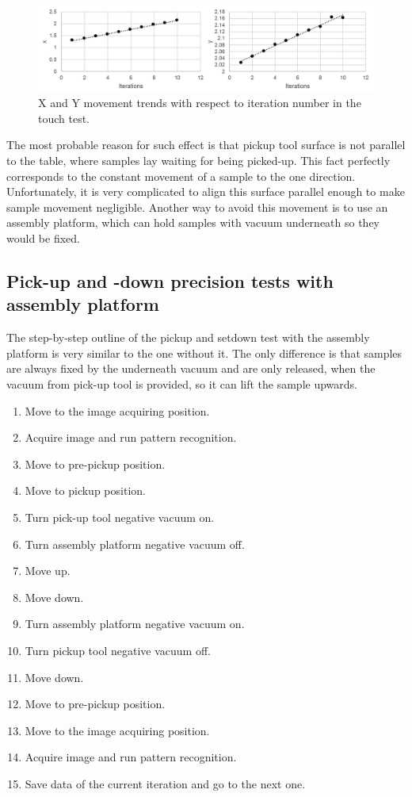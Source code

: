 \begin{figure}[ht]\centering
\includegraphics[width=1\linewidth]{Data/Precision_tests/XY_touch_movement.png}
\caption{X and Y movement trends with respect to iteration number in the touch test.}
\label{fig:touch_move}
\end{figure}

The most probable reason for such effect is that pickup tool surface is not parallel to the table, where samples lay waiting for being picked-up. This fact perfectly corresponds to the constant movement of a sample to the one direction. Unfortunately, it is very complicated to align this surface parallel enough to make sample movement negligible. Another way to avoid this movement is to use an assembly platform, which can hold samples with vacuum underneath so they would be fixed.

\subsection{Pick-up and -down precision tests with assembly platform}

The step-by-step outline of the pickup and setdown test with the assembly platform is very similar to the one without it. The only difference is that samples are always fixed by the underneath vacuum and are only released, when the vacuum from pick-up tool is provided, so it can lift the sample upwards.

\begin{enumerate}
\setlength\itemsep{-0.5em}
\item Move to the image acquiring position.
\item Acquire image and run pattern recognition.
\item Move to pre-pickup position.
\item Move to pickup position.
\item Turn pick-up tool negative vacuum on.
\item Turn assembly platform negative vacuum off.
\item Move up.
\item Move down.
\item Turn assembly platform negative vacuum on.
\item Turn pickup tool negative vacuum off.
\item Move down.
\item Move to pre-pickup position.
\item Move to the image acquiring position.
\item Acquire image and run pattern recognition.
\item Save data of the current iteration and go to the next one.
\end{enumerate}

